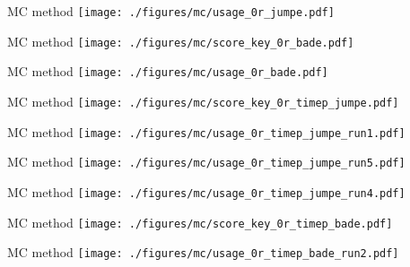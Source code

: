 \documentclass[hyperref={pdfpagelabels=false}]{beamer}
\begin{document}
\begin{frame}{MC method}
\texttt{[image: ./figures/mc/usage\_0r\_jumpe.pdf]}
\end{frame}

\begin{frame}{MC method}
\texttt{[image: ./figures/mc/score\_key\_0r\_bade.pdf]}
\end{frame}

\begin{frame}{MC method}
\texttt{[image: ./figures/mc/usage\_0r\_bade.pdf]}
\end{frame}

\begin{frame}{MC method}
\texttt{[image: ./figures/mc/score\_key\_0r\_timep\_jumpe.pdf]}
\end{frame}

\begin{frame}{MC method}
\texttt{[image: ./figures/mc/usage\_0r\_timep\_jumpe\_run1.pdf]}
\end{frame}

\begin{frame}{MC method}
\texttt{[image: ./figures/mc/usage\_0r\_timep\_jumpe\_run5.pdf]}
\end{frame}

\begin{frame}{MC method}
\texttt{[image: ./figures/mc/usage\_0r\_timep\_jumpe\_run4.pdf]}
\end{frame}

\begin{frame}{MC method}
\texttt{[image: ./figures/mc/score\_key\_0r\_timep\_bade.pdf]}
\end{frame}

\begin{frame}{MC method}
\texttt{[image: ./figures/mc/usage\_0r\_timep\_bade\_run2.pdf]}
\end{frame}
\end{document}
